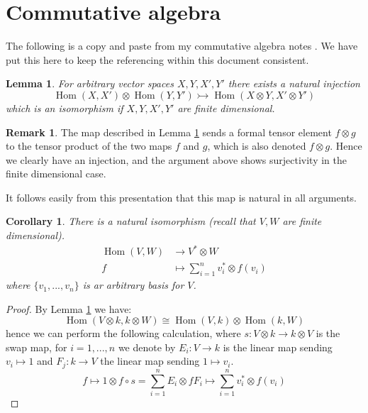 \documentclass[12pt]{article}
\theoremstyle{plain}
\newtheorem{lemma}[thm]{Lemma}
\newtheorem{cor}[thm]{Corollary}
\theoremstyle{definition}
\newtheorem{remark}[thm]{Remark}
\newcommand{\lto}{\longrightarrow}
\begin{document}
\section{Commutative algebra}\label{sec:commutative_algebra}
The following is a copy and paste from my commutative algebra notes \cite{CommutativeAlgebra}. We have put this here to keep the referencing within this document consistent.
\begin{lemma}\label{lem:embedding_tensor}
	For arbitrary vector spaces $X,Y,X',Y'$ there exists a natural injection
	\begin{equation}
		\operatorname{Hom}(X,X') \otimes \operatorname{Hom}(Y,Y') \rightarrowtail \operatorname{Hom}(X \otimes Y, X'\otimes Y')
	\end{equation}
	which is an isomorphism if $X,Y,X',Y'$ are finite dimensional.
\end{lemma}
\begin{remark}
	The map described in Lemma \ref{lem:embedding_tensor} sends a formal tensor element $f \otimes g$ to the tensor product of the two maps $f$ and $g$, which is also denoted $f \otimes g$. Hence we clearly have an injection, and the argument above shows surjectivity in the finite dimensional case.
	
	It follows easily from this presentation that this map is natural in all arguments.
\end{remark}
\begin{cor}\label{cor:hom_dual}
	There is a natural isomorphism (recall that $V,W$ are finite dimensional).
	\begin{align}
		\operatorname{Hom}(V,W) &\lto V^\ast \otimes W\\
		f &\longmapsto \sum_{i = 1}^n v_i^\ast \otimes f(v_i)
	\end{align}
	where $\lbrace v_1,..., v_n\rbrace$ is ar arbitrary basis for $V$.
\end{cor}
\begin{proof}
	By Lemma \ref{lem:embedding_tensor} we have:
	\begin{equation}
		\operatorname{Hom}(V \otimes k, k\otimes W) \cong \operatorname{Hom}(V, k) \otimes \operatorname{Hom}(k, W)
	\end{equation}
	hence we can perform the following calculation, where $s: V \otimes k \lto k \otimes V$ is the swap map, for $i=1,...,n$ we denote by $E_{i}: V \lto k$ is the linear map sending $v_i \longmapsto 1$ and $F_{j}: k \lto V$ the linear map sending $1 \longmapsto v_i$.
	\begin{equation}
		f \longmapsto 1 \otimes f \circ s = \sum_{i = 1}^n E_{i} \otimes f F_{i} \longmapsto \sum_{i = 1}^n v_i^\ast \otimes f(v_i)
	\end{equation}
\end{proof}
\end{document}
